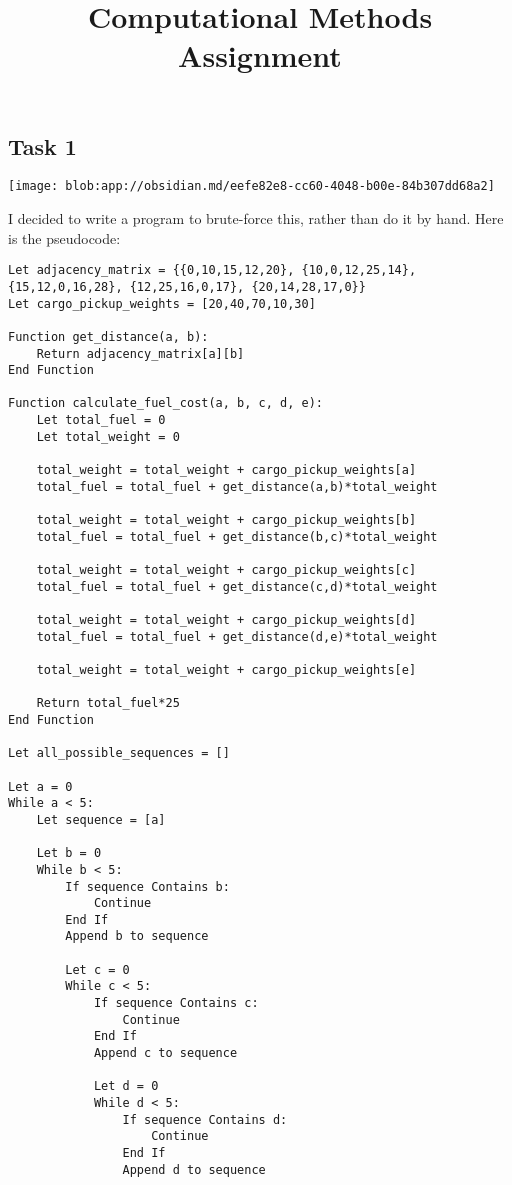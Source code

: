 \documentclass[
]{article}
\title{Computational Methods Assignment}
\author{}
\date{}
\begin{document}
\maketitle

\subsection{Task 1}\label{task-1}

\texttt{[image: blob:app://obsidian.md/eefe82e8-cc60-4048-b00e-84b307dd68a2]}

\hfill\break
I decided to write a program to brute-force this, rather than do it by
hand. Here is the pseudocode:

\begin{verbatim}
Let adjacency_matrix = {{0,10,15,12,20}, {10,0,12,25,14}, {15,12,0,16,28}, {12,25,16,0,17}, {20,14,28,17,0}}
Let cargo_pickup_weights = [20,40,70,10,30]

Function get_distance(a, b):
    Return adjacency_matrix[a][b]
End Function

Function calculate_fuel_cost(a, b, c, d, e):
    Let total_fuel = 0
    Let total_weight = 0

    total_weight = total_weight + cargo_pickup_weights[a]
    total_fuel = total_fuel + get_distance(a,b)*total_weight

    total_weight = total_weight + cargo_pickup_weights[b]
    total_fuel = total_fuel + get_distance(b,c)*total_weight

    total_weight = total_weight + cargo_pickup_weights[c]
    total_fuel = total_fuel + get_distance(c,d)*total_weight

    total_weight = total_weight + cargo_pickup_weights[d]
    total_fuel = total_fuel + get_distance(d,e)*total_weight

    total_weight = total_weight + cargo_pickup_weights[e]

    Return total_fuel*25
End Function

Let all_possible_sequences = []

Let a = 0
While a < 5:
    Let sequence = [a]

    Let b = 0
    While b < 5:
        If sequence Contains b:
            Continue
        End If
        Append b to sequence

        Let c = 0
        While c < 5:
            If sequence Contains c:
                Continue
            End If
            Append c to sequence

            Let d = 0
            While d < 5:
                If sequence Contains d:
                    Continue
                End If
                Append d to sequence


\end{verbatim}
\end{document}
